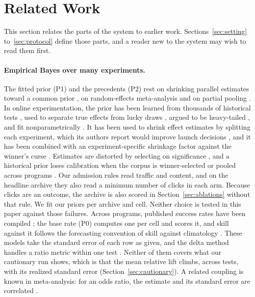 \section{Related Work}
\label{sec:related}
This section relates the parts of the system to earlier work. Sections~\ref{sec:setting} to~\ref{sec:protocol} define those parts, and a reader new to the system may wish to read them first.

\paragraph{Empirical Bayes over many experiments.}
The fitted prior (P1) and the precedents (P2) rest on shrinking parallel estimates toward a common prior \cite{efron1975stein}, on random-effects meta-analysis \cite{dersimonian1986meta} and on partial pooling \cite{gelman2007multilevel}. In online experimentation, the prior has been learned from thousands of historical tests \cite{deng2015objective}, used to separate true effects from lucky draws \cite{azevedo2019empirical}, argued to be heavy-tailed \cite{azevedo2020fat}, and fit nonparametrically \cite{guo2020empirical}. It has been used to shrink effect estimates by splitting each experiment, which its authors report would improve launch decisions \cite{coey2019improving}, and it has been combined with an experiment-specific shrinkage factor against the winner's curse \cite{mudd2026breaking}. Estimates are distorted by selecting on significance \cite{deng2021postselection}, and a historical prior loses calibration when the corpus is winner-selected or pooled across programs \cite{schultzberg2026bayesian}. Our admission rules read traffic and content, and on the headline archive they also read a minimum number of clicks in each arm. Because clicks are an outcome, the archive is also scored in Section~\ref{sec:ablations} without that rule. We fit our priors per archive and cell. Neither choice is tested in this paper against those failures. Across programs, published success rates have been compiled \cite{kohavi2022intuition,deng2015objective}; the base rate (P0) computes one per cell and scores it, and skill against it follows the forecasting convention of skill against climatology \cite{murphy1973vector}. These models take the standard error of each row as given, and the delta method handles a ratio metric within one test \cite{deng2018delta}. Neither of them covers what our cautionary run shows, which is that the mean relative lift climbs, across tests, with its realized standard error (Section~\ref{sec:cautionary}). A related coupling is known in meta-analysis: for an odds ratio, the estimate and its standard error are correlated \cite{peters2006comparison}.

